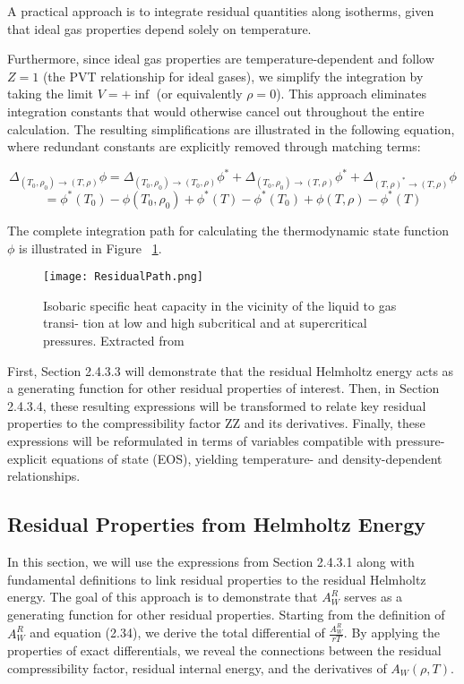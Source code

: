A practical approach is to integrate residual quantities along isotherms, given
that ideal gas properties depend solely on temperature.

Furthermore, since ideal gas properties are temperature-dependent and follow
$Z=1$ (the PVT relationship for ideal gases), we simplify the integration by
taking the limit $V=+\inf$ (or equivalently $\rho=0$). This approach eliminates
integration constants that would otherwise cancel out throughout the entire
calculation. The resulting simplifications are illustrated in the following
equation, where redundant constants are explicitly removed through matching
terms:

\[
\Delta_{(T_0, \rho_0) \rightarrow (T, \rho)} \phi = \Delta_{(T_0, \rho_0) \rightarrow (T_0, \rho)} \phi^* + \Delta_{(T_0, \rho_0) \rightarrow (T, \rho)} \phi^* + \Delta_{(T, \rho)^* \rightarrow (T, \rho)} \phi
\]
\[
= \phi^*(T_0) - \phi(T_0, \rho_0) + \phi^*(T) - \phi^*(T_0) + \phi(T, \rho) - \phi^*(T)
\]

The complete integration path for calculating the thermodynamic state function
$\phi$ is illustrated in Figure ~\ref{ResidualPath}.

\begin{figure}[h!]
	\centering
	\texttt{[image: ResidualPath.png]}
	\caption{Isobaric specific heat capacity in the vicinity of the liquid
	to gas transi- tion at low and high subcritical and at supercritical
	pressures. Extracted from \cite{banuti2019latent}}
\label{ResidualPath}
\end{figure}

First, Section 2.4.3.3 will demonstrate that the residual Helmholtz energy acts
as a generating function for other residual properties of interest. Then, in
Section 2.4.3.4, these resulting expressions will be transformed to relate key
residual properties to the compressibility factor ZZ and its derivatives.
Finally, these expressions will be reformulated in terms of variables compatible
with pressure-explicit equations of state (EOS), yielding temperature- and
density-dependent relationships.

\subsection{Residual Properties from Helmholtz Energy}

In this section, we will use the expressions from Section 2.4.3.1 along with
fundamental definitions to link residual properties to the residual Helmholtz
energy. The goal of this approach is to demonstrate that $A_W^R$ serves as a
generating function for other residual properties. Starting from the definition
of $A_W^R$ and equation (2.34), we derive the total differential of
$\frac{A_W^R}{rT}$. By applying the properties of exact differentials, we reveal the
connections between the residual compressibility factor, residual internal
energy, and the derivatives of $A_W(\rho,T)$.


